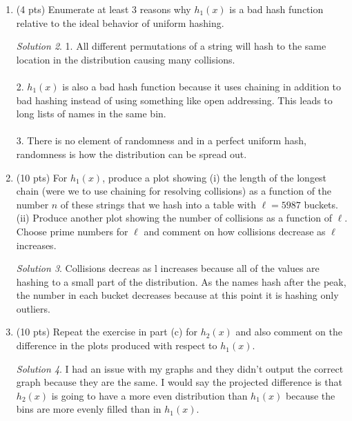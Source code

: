 \documentclass[12pt]{article}
\theoremstyle{remark}
\newtheorem*{solution}{Solution}
\begin{document}
\begin{enumerate}
\begin{enumerate}
	Hint: the raw file includes information other than the name strings, which will need to be removed; and, think about how you can count hash locations without building or using a real hash table.
	
	\begin{solution}
    
    \end{solution}
    \pagebreak
	
	
	\item (4 pts) Enumerate at least 3 reasons why $h_1(x)$ is a bad hash function relative to the ideal behavior of uniform hashing.
	\begin{solution}
    1. All different permutations of a string will hash to the same location in the distribution causing many collisions. \\ \\
2. $h_1(x)$ is also a bad hash function because it uses chaining in addition to bad hashing instead of using something like open addressing. This leads to long lists of names in the same bin. \\ \\
3. There is no element of randomness and in a perfect uniform hash, randomness is how the distribution can be spread out.
    \end{solution}
	\pagebreak
	
	\item 
		(10 pts) For $h_1(x)$, produce a plot showing (i) the length of the longest chain (were we to use chaining for resolving collisions) as a function of the number $n$ of these strings that we hash into a table with $\ell=5987$ buckets. (ii) Produce another plot showing the number of collisions as a function of $\ell$. Choose prime numbers for $\ell$ and comment on how collisions decrease as $\ell$ increases. 
    \begin{solution}
    Collisions decreas as l increases because all of the values are hashing to a small part of the distribution. As the names hash after the peak, the number in each bucket decreases because at this point it is hashing only outliers.
    \end{solution}
    \pagebreak
		
	\item (10 pts) Repeat the exercise in part (c) for $h_2(x)$ and also comment on the difference in the plots produced with respect to $h_1(x)$. 
	\begin{solution}
    I had an issue with my graphs and they didn't output the correct graph because they are the same. I would say the projected difference is that $h_2(x)$ is going to have a more even distribution than $h_1(x)$ because the bins are more evenly filled than in $h_1(x)$.
    \end{solution}
    \pagebreak
	

\end{enumerate}
\end{enumerate}
\end{document}
